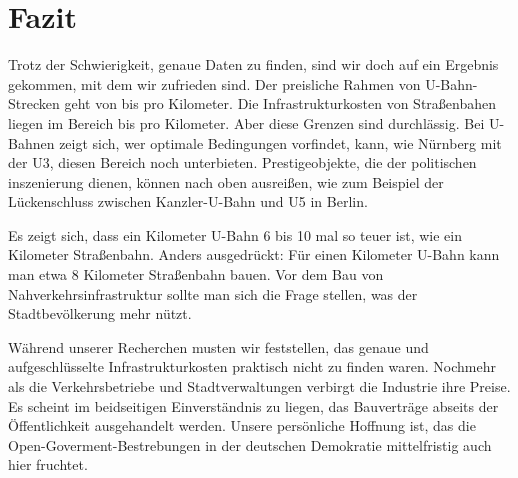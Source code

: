 \chapter{Fazit}




Trotz der Schwierigkeit, genaue Daten zu finden, sind wir doch auf ein Ergebnis gekommen, mit dem wir zufrieden sind. Der preisliche Rahmen von U-Bahn-Strecken geht von  bis  pro Kilometer. Die Infrastrukturkosten von Straßenbahen liegen im Bereich  bis  pro Kilometer. Aber diese Grenzen sind durchlässig. Bei U-Bahnen zeigt sich, wer optimale Bedingungen vorfindet, kann, wie Nürnberg mit der U3, diesen Bereich noch unterbieten. Prestigeobjekte, die der politischen inszenierung dienen, können nach oben ausreißen, wie zum Beispiel der Lückenschluss zwischen Kanzler-U-Bahn und U5 in Berlin. 

Es zeigt sich, dass ein Kilometer U-Bahn 6 bis 10 mal so teuer ist, wie ein Kilometer Straßenbahn. Anders ausgedrückt: Für einen Kilometer U-Bahn kann man etwa 8 Kilometer Straßenbahn bauen. Vor dem Bau von Nahverkehrsinfrastruktur sollte man sich die Frage stellen, was der Stadtbevölkerung mehr nützt. 

Während unserer Recherchen musten wir feststellen, das genaue und aufgeschlüsselte Infrastrukturkosten praktisch nicht zu finden waren. Nochmehr als die Verkehrsbetriebe und Stadtverwaltungen verbirgt die Industrie ihre Preise. Es scheint im beidseitigen Einverständnis zu liegen, das Bauverträge abseits der Öffentlichkeit ausgehandelt werden. Unsere persönliche Hoffnung ist, das die Open-Goverment-Bestrebungen in der deutschen Demokratie mittelfristig auch hier fruchtet. 